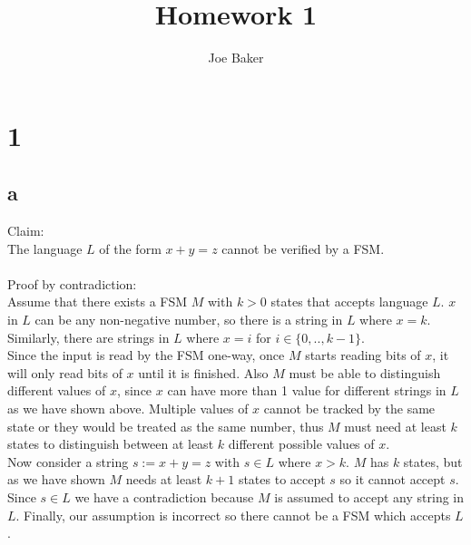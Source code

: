 \documentclass[letterpaper,notitlepage,twoside]{article}
\begin{document}
\title{Homework 1}
\author{Joe Baker}
\maketitle
\section*{1}

\subsection*{a}
Claim:\\
The language $L$ of the form $x + y = z$ cannot be verified by a FSM.\\\\
Proof by contradiction:\\
Assume that there exists a FSM $M$ with $k > 0$ states that accepts language $L$. $x$ in $L$ can be any non-negative number, so there is a string in $L$ where $x = k$. Similarly, there are strings in $L$ where $x = i$ for $i \in \{0,..,k-1\}$.\\
Since the input is read by the FSM one-way, once $M$ starts reading bits of $x$, it will only read bits of $x$ until it is finished. Also $M$ must be able to distinguish different values of $x$, since $x$ can have more than 1 value for different strings in $L$ as we have shown above. Multiple values of $x$ cannot be tracked by the same state or they would be treated as the same number, thus $M$ must need at least $k$ states to distinguish between at least $k$ different possible values of $x$.\\
Now consider a string $s := x + y = z$ with $s \in L$ where $x > k$. $M$ has $k$ states, but as we have shown $M$ needs at least $k+1$ states to accept $s$ so it cannot accept $s$. Since $s \in L$ we have a contradiction because $M$ is assumed to accept any string in $L$. Finally, our assumption is incorrect so there cannot be a FSM which accepts $L$.
\end{document}
